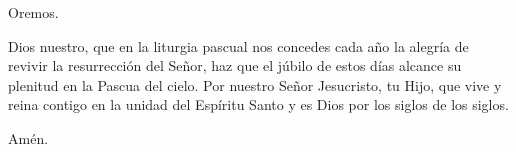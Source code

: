 \pr Oremos.

\pr Dios nuestro, que en la liturgia pascual nos concedes cada año la alegría de revivir la resurrección del Señor, haz que el júbilo de estos días alcance su plenitud en la Pascua del cielo. Por nuestro Señor Jesucristo, tu Hijo, que vive y reina contigo en la unidad del Espíritu Santo y es Dios por los siglos de los siglos.

\be Amén.